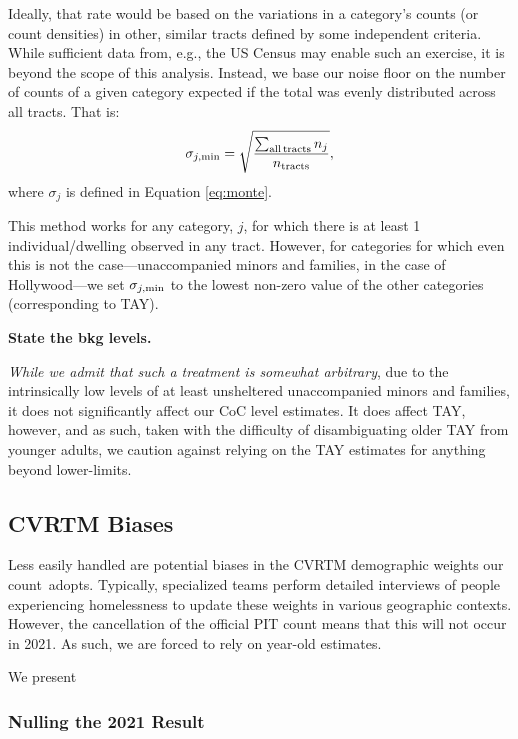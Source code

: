 \documentclass[11pt,twocolumn]{article}
\def\bfr{\bf\color{red}}
\def\Count{count}
\begin{document}
Ideally, that rate would be based on the variations in a category's counts (or count densities) in other, 
similar tracts defined by some independent criteria. While sufficient data from, e.g., the US Census 
may enable such an exercise, it is beyond the scope of this analysis. Instead, we base our noise floor 
on the number of counts of a given category expected if the total was evenly distributed across 
all tracts. That is:
\begin{equation}
	\sigma_{j, \rm min} = \sqrt{\frac{\sum_{\rm all\, tracts}n_{j}}{n_{\rm tracts}}},
\end{equation}
where $\sigma_{j}$ is defined in Equation \ref{eq:monte}.

This method works for any category, $j$, for which there is at least 1 individual/dwelling observed in any 
tract. However, for categories for which even this is not the case---unaccompanied minors and families, in the
case of Hollywood---we set $\sigma_{j, \rm min}$ to the lowest non-zero value of the other categories
(corresponding to TAY).

{\bfr State the bkg levels.}

{\it While we admit that such a treatment is 
somewhat arbitrary}, due to the intrinsically low levels of at least unsheltered unaccompanied minors 
and families, it does not significantly affect our CoC level estimates. It does affect TAY, however, and
as such, taken with the difficulty of disambiguating older TAY from younger adults, we caution against 
relying on the TAY estimates for anything beyond lower-limits.

\subsection{CVRTM Biases}
\label{sec:CVRTM}

Less easily handled are potential biases in the CVRTM demographic weights our \Count\ adopts.
Typically, specialized teams perform detailed interviews of people experiencing homelessness to update 
these weights in various geographic contexts. However, the cancellation of the official PIT count means
that this will not occur in 2021. As such, we are forced to rely on year-old estimates.

We present 

\subsubsection{Nulling the 2021 Result}
\label{sec:nullOut}
\end{document}

